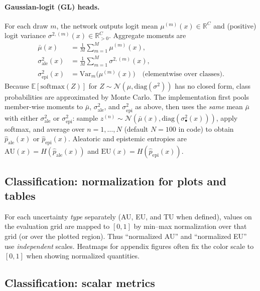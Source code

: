\paragraph{Gaussian-logit (GL) heads.}
For each draw $m$, the network outputs logit mean $\mu^{(m)}(x)\in\mathbb{R}^C$ and (positive) logit variance $\sigma^{2,(m)}(x)\in\mathbb{R}^C_{>0}$. Aggregate moments are
\begin{align}
  \bar\mu(x) &= \frac{1}{M}\sum_{m=1}^M \mu^{(m)}(x), \\
  \sigma^2_{\mathrm{ale}}(x) &= \frac{1}{M}\sum_{m=1}^M \sigma^{2,(m)}(x), \\
  \sigma^2_{\mathrm{epi}}(x) &= \mathrm{Var}_m\bigl(\mu^{(m)}(x)\bigr)
  \quad\text{(elementwise over classes).}
\end{align}
Because $\mathbb{E}[\mathrm{softmax}(Z)]$ for $Z\sim\mathcal{N}(\mu,\mathrm{diag}(\sigma^2))$ has no closed form, class probabilities are approximated by Monte Carlo. The implementation first pools member-wise moments to $\bar\mu$, $\sigma^2_{\mathrm{ale}}$, and $\sigma^2_{\mathrm{epi}}$ as above, then uses the \emph{same} mean $\bar\mu$ with either $\sigma^2_{\mathrm{ale}}$ or $\sigma^2_{\mathrm{epi}}$: sample $z^{(n)}\sim\mathcal{N}(\bar\mu(x),\mathrm{diag}(\sigma^2_{\bullet}(x)))$, apply softmax, and average over $n=1,\ldots,N$ (default $N=100$ in code) to obtain $\hat p_{\mathrm{ale}}(x)$ or $\hat p_{\mathrm{epi}}(x)$. Aleatoric and epistemic entropies are $\mathrm{AU}(x)=H(\hat p_{\mathrm{ale}}(x))$ and $\mathrm{EU}(x)=H(\hat p_{\mathrm{epi}}(x))$.

\subsection{Classification: normalization for plots and tables}
\label{sec:clf-norm}

For each uncertainty \emph{type} separately (AU, EU, and TU when defined), values on the evaluation grid are mapped to $[0,1]$ by min--max normalization over that grid (or over the plotted region). Thus ``normalized AU'' and ``normalized EU'' use \emph{independent} scales. Heatmaps for appendix figures often fix the color scale to $[0,1]$ when showing normalized quantities.

\subsection{Classification: scalar metrics}
\label{sec:clf-metrics}

